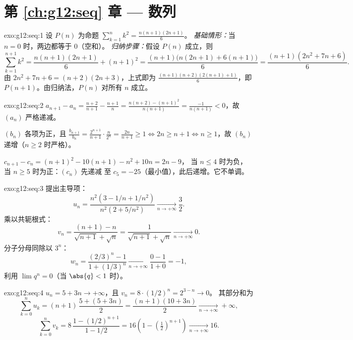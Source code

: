 \section*{第 \ref{ch:g12:seq} 章 --- 数列}

\begin{solution}{exo:g12:seq:1}
设 $P(n)$ 为命题 $\sum_{k=1}^{n} k^2 = \frac{n(n+1)(2n+1)}{6}$。
\emph{基础情形：}当 $n = 0$ 时，两边都等于 $0$（空和）。
\emph{归纳步骤：}假设 $P(n)$ 成立，则
\[
\sum_{k=1}^{n+1} k^2 = \frac{n(n+1)(2n+1)}{6} + (n+1)^2
= \frac{(n+1)\bigl(n(2n+1) + 6(n+1)\bigr)}{6}
= \frac{(n+1)(2n^2 + 7n + 6)}{6}.
\]
由 $2n^2 + 7n + 6 = (n+2)(2n+3)$，上式即为
$\frac{(n+1)(n+2)(2(n+1)+1)}{6}$，即 $P(n+1)$。由归纳法，$P(n)$
对所有 $n$ 成立。
\end{solution}

\begin{solution}{exo:g12:seq:2}
$a_{n+1} - a_n = \frac{n+2}{n+1} - \frac{n+1}{n}
= \frac{n(n+2) - (n+1)^2}{n(n+1)} = \frac{-1}{n(n+1)} < 0$，故 $(a_n)$
严格递减。

$(b_n)$ 各项为正，且
$\frac{b_{n+1}}{b_n} = \frac{2^{n+1}}{n+1}\cdot\frac{n}{2^n} =
\frac{2n}{n+1} \geq 1 \iff 2n \geq n+1 \iff n \geq 1$，故 $(b_n)$
递增（$n \geq 2$ 时严格）。

$c_{n+1} - c_n = (n+1)^2 - 10(n+1) - n^2 + 10n = 2n - 9$，
当 $n \leq 4$ 时为负，当 $n \geq 5$ 时为正：$(c_n)$ 先递减
至 $c_5 = -25$（最小值），此后递增。它不单调。
\end{solution}

\begin{solution}{exo:g12:seq:3}
提出主导项：
\[
u_n = \frac{n^2(3 - 1/n + 1/n^2)}{n^2(2 + 5/n^2)} \xrightarrow[n\to+\infty]{} \frac{3}{2}.
\]
乘以共轭根式：
\[
v_n = \frac{(n+1) - n}{\sqrt{n+1} + \sqrt{n}} = \frac{1}{\sqrt{n+1}+\sqrt{n}}
\xrightarrow[n\to+\infty]{} 0.
\]
分子分母同除以 $3^n$：
\[
w_n = \frac{(2/3)^n - 1}{1 + (1/3)^n} \xrightarrow[n\to+\infty]{} \frac{0-1}{1+0} = -1,
\]
利用 $\lim q^n = 0$（当 $\abs{q} < 1$ 时）。
\end{solution}

\begin{solution}{exo:g12:seq:4}
$u_n = 5 + 3n \to +\infty$，且 $v_n = 8 \cdot (1/2)^n = 2^{3-n} \to 0$。
其部分和为
\[
\sum_{k=0}^{n} u_k = (n+1)\,\frac{5 + (5+3n)}{2} = \frac{(n+1)(10+3n)}{2}
\xrightarrow[n\to+\infty]{} +\infty,
\]
\[
\sum_{k=0}^{n} v_k = 8\,\frac{1 - (1/2)^{n+1}}{1 - 1/2}
= 16\left(1 - \left(\tfrac{1}{2}\right)^{n+1}\right)
\xrightarrow[n\to+\infty]{} 16 .
\]
\end{solution}

